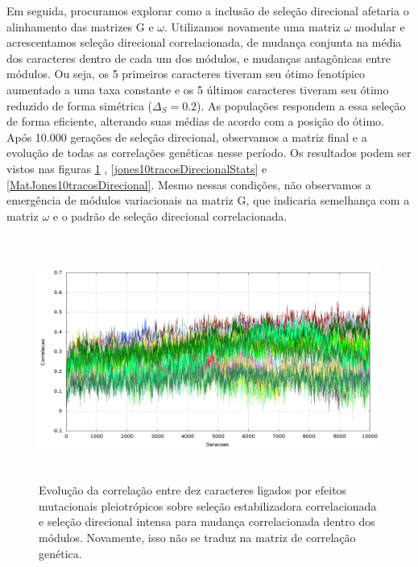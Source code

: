 Em seguida, procuramos explorar como a inclusão de seleção direcional afetaria o
alinhamento das matrizes G e $\omega$. 
Utilizamos novamente uma matriz $\omega$ modular e acrescentamos seleção
direcional correlacionada, de mudança conjunta na média dos caracteres
dentro de cada um dos módulos, e mudanças antagônicas entre módulos. 
Ou seja, os 5 primeiros caracteres tiveram seu ótimo fenotípico aumentado a
uma taxa constante e os 5 últimos caracteres tiveram seu ótimo reduzido de
forma simétrica ($\Delta_S=0.2$). 
As populações respondem a essa seleção de forma eficiente, alterando
suas médias de acordo com a posição do ótimo. 
Após 10.000 gerações de seleção direcional, observamos a matriz final
e a evolução de todas as correlações genéticas nesse período. 
Os resultados podem ser vistos nas figuras \ref{jones10tracosDirecional}
, \ref{jones10tracosDirecionalStats} e \ref{MatJones10tracosDirecional}. 
Mesmo nessas condições, não observamos a emergência de módulos
variacionais na matriz G, que indicaria semelhança com a matriz $\omega$
e o padrão de seleção direcional correlacionada. 


\begin{figure}[htbp]
    \centering
    \includegraphics[width=150mm, height=80mm]{figuras/jones10tracosDirecional.png}
    \caption{Evolução da correlação entre dez caracteres ligados por efeitos
        mutacionais pleiotrópicos sobre seleção estabilizadora correlacionada
        e seleção direcional intensa para mudança correlacionada dentro dos
    módulos. Novamente, isso não se traduz na matriz de correlação genética.}
    \label{jones10tracosDirecional}
\end{figure}



